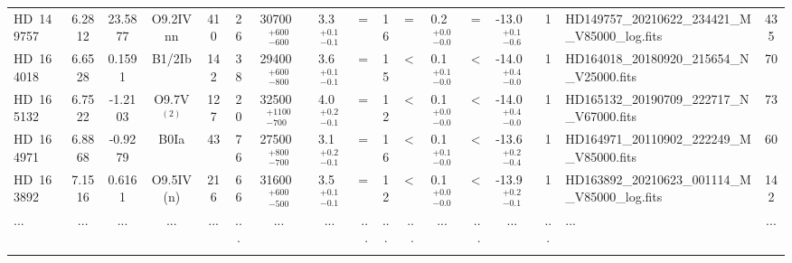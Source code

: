{\begin{landscape}
\begin{longtable}{lcccccccrcrcrcclc}
HD~149757 & 6.2812 & 23.5877 & O9.2IVnn & 410 & 26 & 30700~$_{-600}^{+600}$ & 3.3~$_{-0.1}^{+0.1}$ & = & 16 & = & 0.2~$_{-0.0}^{+0.0}$ & = & -13.0~$_{-0.6}^{+0.1}$ & 1 & HD149757\_20210622\_234421\_M\_V85000\_log.fits & 435 \\\noalign{\smallskip}
HD~164018 & 6.6528 & 0.1591 & B1/2Ib & 142 & 38 & 29400~$_{-800}^{+600}$ & 3.6~$_{-0.1}^{+0.1}$ & = & 15 & < & 0.1~$_{-0.0}^{+0.1}$ & < & -14.0~$_{-0.0}^{+0.4}$ & 1 & HD164018\_20180920\_215654\_N\_V25000.fits & 70 \\\noalign{\smallskip}
HD~165132 & 6.7522 & -1.2103 & O9.7V$^{(2)}$ & 127 & 20 & 32500~$_{-700}^{+1100}$ & 4.0~$_{-0.1}^{+0.2}$ & = & 12 & < & 0.1~$_{-0.0}^{+0.0}$ & < & -14.0~$_{-0.0}^{+0.4}$ & 1 & HD165132\_20190709\_222717\_N\_V67000.fits & 73 \\\noalign{\smallskip}
HD~164971 & 6.8868 & -0.9279 & B0Ia & 43 & 76 & 27500~$_{-700}^{+800}$ & 3.1~$_{-0.1}^{+0.2}$ & = & 16 & < & 0.1~$_{-0.0}^{+0.1}$ & < & -13.6~$_{-0.4}^{+0.2}$ & 1 & HD164971\_20110902\_222249\_M\_V85000.fits & 60 \\\noalign{\smallskip}
HD~163892 & 7.1516 & 0.6161 & O9.5IV(n) & 216 & 66 & 31600~$_{-500}^{+600}$ & 3.5~$_{-0.1}^{+0.1}$ & = & 12 & < & 0.1~$_{-0.0}^{+0.0}$ & < & -13.9~$_{-0.1}^{+0.2}$ & 1 & HD163892\_20210623\_001114\_M\_V85000\_log.fits & 142 \\\noalign{\smallskip}
... & ... & ... & ... & ... & ... & ... & ... & ... & ... & ... & ... & ... & ... & ... & ... & ... \\\noalign{\smallskip}

\end{longtable}


\end{landscape}
}
